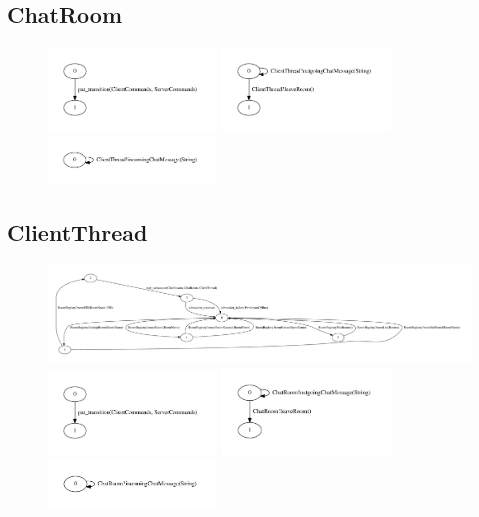 \documentclass[a4paper]{article}
\begin{document}
\subsection{ChatRoom}
\begin{figure}[H]
\centering
\includegraphics[width=0.4\textwidth]{chatsession_chatroom_dot.pdf}
\includegraphics[width=0.4\textwidth]{chatsession_chatroom_dot_2.pdf} \\
\includegraphics[width=0.4\textwidth]{chatsession_chatroom_dot_3.pdf}
\end{figure}

\subsection{ClientThread}
\begin{figure}[H]
\centering
\includegraphics[width=\textwidth]{chatserver_clientthread_dot.pdf} \\
\includegraphics[width=0.4\textwidth]{chatsession_clientthread_dot.pdf}
\includegraphics[width=0.4\textwidth]{chatsession_clientthread_dot_2.pdf} \\
\includegraphics[width=0.4\textwidth]{chatsession_clientthread_dot_3.pdf}

\end{figure}
\end{document}
